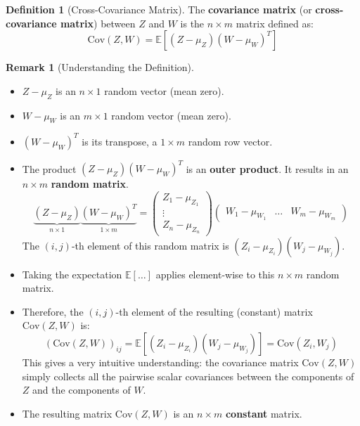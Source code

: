 \documentclass[11pt]{article}
\theoremstyle{definition}
\newtheorem{definition}[theorem]{Definition}
\newtheorem{remark}[theorem]{Remark}
\newcommand{\E}{\mathbb{E}}
\newcommand{\Cov}{\mathrm{Cov}}
\begin{document}
\begin{definition}[Cross-Covariance Matrix]
The \textbf{covariance matrix} (or \textbf{cross-covariance matrix}) between $Z$ and $W$ is the $n \times m$ matrix defined as:
\[ \Cov(Z, W) = \E[ (Z - \mu_Z) (W - \mu_W)^T ] \]
\end{definition}

\begin{remark}[Understanding the Definition]
\begin{itemize}
    \item $Z - \mu_Z$ is an $n \times 1$ random vector (mean zero).
    \item $W - \mu_W$ is an $m \times 1$ random vector (mean zero).
    \item $(W - \mu_W)^T$ is its transpose, a $1 \times m$ random row vector.
    \item The product $(Z - \mu_Z) (W - \mu_W)^T$ is an \textbf{outer product}. It results in an $n \times m$ \textbf{random matrix}.
    \[ \underbrace{(Z - \mu_Z)}_{n \times 1} \underbrace{(W - \mu_W)^T}_{1 \times m} =
       \begin{pmatrix} Z_1 - \mu_{Z_1} \\ \vdots \\ Z_n - \mu_{Z_n} \end{pmatrix}
       \begin{pmatrix} W_1 - \mu_{W_1} & \dots & W_m - \mu_{W_m} \end{pmatrix}
    \]
    The $(i,j)$-th element of this random matrix is $(Z_i - \mu_{Z_i})(W_j - \mu_{W_j})$.
    \item Taking the expectation $\E[\dots]$ applies element-wise to this $n \times m$ random matrix.
    \item Therefore, the $(i,j)$-th element of the resulting (constant) matrix $\Cov(Z, W)$ is:
    \[ (\Cov(Z, W))_{ij} = \E[ (Z_i - \mu_{Z_i})(W_j - \mu_{W_j}) ] = \Cov(Z_i, W_j) \]
    This gives a very intuitive understanding: the covariance matrix $\Cov(Z, W)$ simply collects all the pairwise scalar covariances between the components of $Z$ and the components of $W$.
    \item The resulting matrix $\Cov(Z, W)$ is an $n \times m$ \textbf{constant} matrix.
\end{itemize}
\end{remark}
\end{document}
